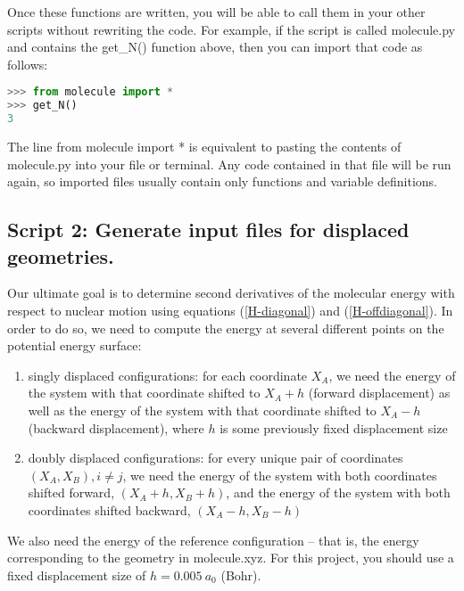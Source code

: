 \documentclass[11pt]{article}
\newcommand{\ttf}[1]{{\ttfamily #1}}
\begin{document}
\begin{enumerate}[label=\textbf{\arabic*}]
Once these functions are written, you will be able to call them in your other scripts without rewriting the code.
For example, if the script is called \ttf{molecule.py} and contains the \ttf{get\_N()} function above, then you can import that code as follows:
\begin{addmargin}{2cm}{}
\begin{lstlisting}[language=python]
>>> from molecule import *
>>> get_N()
3
\end{lstlisting}
\end{addmargin}
The line \ttf{from molecule import *} is equivalent to pasting the contents of \ttf{molecule.py} into your file or terminal.
Any code contained in that file will be run again, so imported files usually contain only functions and variable definitions.
\end{enumerate}


\subsection{Script 2: Generate input files for displaced geometries.}
Our ultimate goal is to determine second derivatives of the molecular energy with respect to nuclear motion using equations (\ref{H-diagonal}) and (\ref{H-offdiagonal}).
In order to do so, we need to compute the energy at several different points on the potential energy surface:
\begin{enumerate}
	\item singly displaced configurations: for each coordinate $X_A$, we need the energy of the system with that coordinate shifted to $X_A+h$ (forward displacement) as well as the energy of the system with that coordinate shifted to $X_A-h$ (backward displacement), where $h$ is some previously fixed displacement size
	\item doubly displaced configurations: for every unique pair of coordinates $(X_A, X_B), i\neq j$, we need the energy of the system with both coordinates shifted forward, $(X_A+h,X_B+h)$, and the energy of the system with both coordinates shifted backward, $(X_A-h,X_B-h)$
\end{enumerate}
We also need the energy of the reference configuration -- that is, the energy corresponding to the geometry in \ttf{molecule.xyz}.
For this project, you should use a fixed displacement size of $h=0.005~a_0$ (Bohr).
\end{document}
